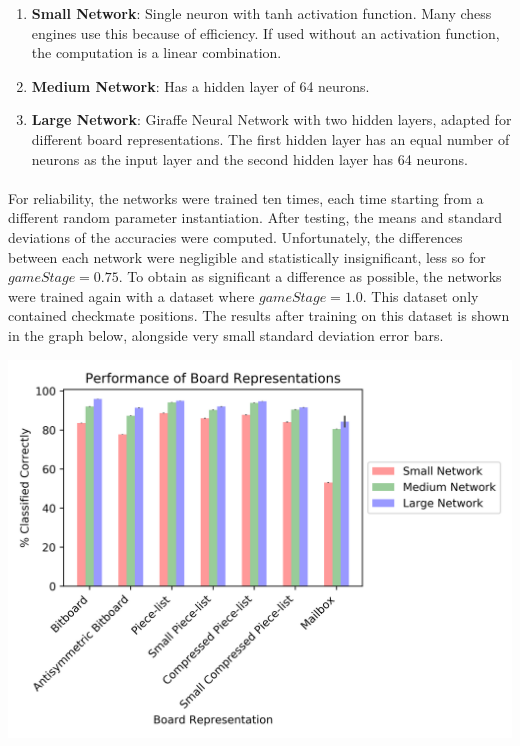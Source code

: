\documentclass[12pt,a4paper]{book}
\begin{document}
\begin{enumerate}
\item \textbf{Small Network}: Single neuron with tanh activation function. Many chess engines use this because of efficiency. If used without an activation function, the computation is a linear combination.
\item \textbf{Medium Network}: Has a hidden layer of 64 neurons.
\item \textbf{Large Network}: Giraffe Neural Network with two hidden layers, adapted for different board representations. The first hidden layer has an equal number of neurons as the input layer and the second hidden layer has 64 neurons.
\end{enumerate}

\paragraph{} For reliability, the networks were trained ten times, each time starting from a different random parameter instantiation. After testing, the means and standard deviations of the accuracies were computed. Unfortunately, the differences between each network were negligible and statistically insignificant, less so for $gameStage = 0.75$. To obtain as significant a difference as possible, the networks were trained again with a dataset where $gameStage = 1.0$. This dataset only contained checkmate positions. The results after training on this dataset is shown in the graph below, alongside very small standard deviation error bars.

\begin{center}
  \includegraphics[scale=0.9]{boardrepr.png}
\end{center}
  
\end{document}
